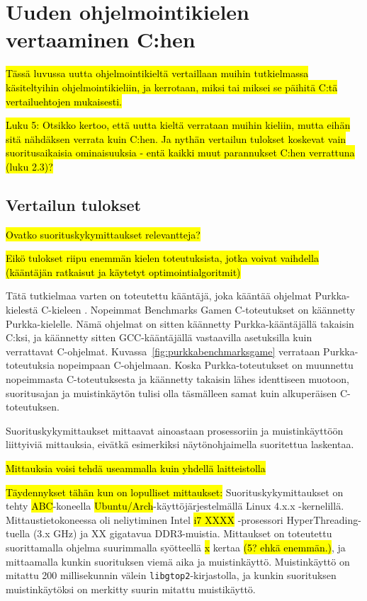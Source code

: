 \section{Uuden ohjelmointikielen vertaaminen C:hen}

\hl{Tässä luvussa uutta ohjelmointikieltä vertaillaan muihin tutkielmassa
käsiteltyihin ohjelmointikieliin, ja kerrotaan, miksi tai miksei se päihitä
C:tä vertailuehtojen mukaisesti.}

\hl{ Luku 5: Otsikko kertoo, että uutta kieltä verrataan muihin kieliin, mutta
eihän sitä nähdäksen verrata kuin C:hen. Ja nythän vertailun tulokset koskevat
vain suoritusaikaisia ominaisuuksia - entä kaikki muut parannukset C:hen
verrattuna (luku 2.3)? }

\subsection{Vertailun tulokset}
\label{sec:results}

\hl{Ovatko suorituskykymittaukset relevantteja?}

\hl{Eikö tulokset riipu enemmän kielen toteutuksista, jotka voivat vaihdella
(kääntäjän ratkaisut ja käytetyt optimointialgoritmit)}

Tätä tutkielmaa varten on toteutettu kääntäjä, joka kääntää ohjelmat
Purkka-kielestä C-kieleen \citep{purkka}. Nopeimmat Benchmarks Gamen
C-toteutukset on käännetty Purkka-kielelle. Nämä ohjelmat on sitten käännetty
Purkka-kääntäjällä takaisin C:ksi, ja käännetty sitten GCC-kääntäjällä
vastaavilla asetuksilla kuin verrattavat C-ohjelmat.
Kuvassa~\ref{fig:purkkabenchmarksgame} verrataan Purkka-toteutuksia nopeimpaan
C-ohjelmaan. Koska Purkka-toteutukset on muunnettu nopeimmasta C-toteutuksesta
ja käännetty takaisin lähes identtiseen muotoon, suoritusajan ja muistinkäytön
tulisi olla täsmälleen samat kuin alkuperäisen C-toteutuksen.

Suorituskykymittaukset mittaavat ainoastaan prosessoriin ja muistinkäyttöön
liittyiviä mittauksia, eivätkä esimerkiksi näytönohjaimella suoritettua
laskentaa.

\hl{Mittauksia voisi tehdä useammalla kuin yhdellä laitteistolla}

\hl{Täydennykset tähän kun on lopulliset mittaukset: } Suorituskykymittaukset
on tehty \hl{ABC}-koneella \hl{Ubuntu/Arch}-käyttöjärjestelmällä Linux 4.x.x
-kernelillä. Mittaustietokoneessa oli neliytiminen Intel \hl{i7 XXXX}
-prosessori HyperThreading-tuella (3.x GHz) ja XX gigatavua DDR3-muistia.
Mittaukset on toteutettu suorittamalla ohjelma suurimmalla syötteellä \hl{x}
kertaa \hl{(5? ehkä enemmän.)}, ja mittaamalla kunkin suorituksen viemä aika ja
muistinkäyttö. Muistinkäyttö on mitattu 200 millisekunnin välein
\texttt{libgtop2}-kirjastolla, ja kunkin suorituksen muistinkäytöksi on merkitty
suurin mitattu muistikäyttö.


